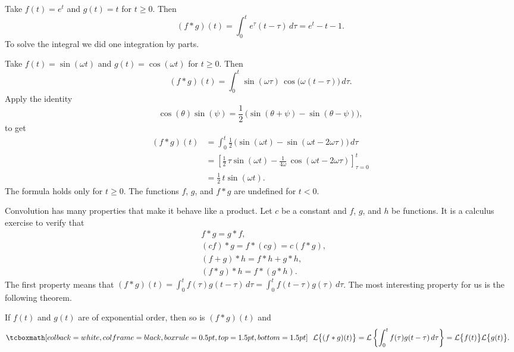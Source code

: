 \begin{example}
Take $f(t) = e^t$ and $g(t) = t$ for $t \geq 0$.  Then 
\begin{equation*}
(f*g)(t)
=
\int_0^t e^\tau (t-\tau) \, d\tau
=
e^t - t - 1 .
\end{equation*}
To solve the integral we
did one integration by parts.
\end{example}

\begin{example} \label{ltc:convsincosex}
Take $f(t) = \sin (\omega t)$ and $g(t) = \cos (\omega t)$ for $t \geq 0$.
Then 
\begin{equation*}
(f*g)(t)
=
\int_0^t  \sin ( \omega \tau ) \,
\cos \bigl( \omega (t-\tau) \bigr) \, d\tau .
\end{equation*}
Apply the identity
\begin{equation*}
\cos (\theta) \sin (\psi) =
\frac{1}{2} \, \bigl( \sin (\theta + \psi) - \sin (\theta - \psi) \bigr) ,
\end{equation*}
to get
\begin{equation*}
\begin{split}
(f*g)(t)
& =
\int_0^t
\frac{1}{2} \, \bigl( \sin (\omega t) - \sin (\omega t - 2 \omega \tau
) \bigr) \, d\tau
\\
& =
\left[ \frac{1}{2} \, \tau  \sin (\omega t) - \frac{1}{4\omega} \, \cos
(\omega t - 2 \omega \tau) \right]_{\tau=0}^t
\\
& = \frac{1}{2} \, t \sin (\omega t) .
\end{split}
\end{equation*}
The formula holds only for $t \geq 0$.  The functions $f$, $g$,
and $f*g$ are undefined for $t < 0$.
\end{example}

Convolution has many properties that make it behave like a product.
Let $c$ be a constant and $f$, $g$, and $h$ be functions.
It is a calculus exercise to verify that
\begin{align*}
& f * g = g * f , \\
& (c f) * g = f * (c g) = c (f*g) , \\
& (f+g) * h = f * h + g * h , \\
& ( f * g ) * h = f * ( g * h ) .
\end{align*}
The first property means that $(f * g)(t) =
\int_0^t f(\tau) g(t-\tau) \, d\tau = 
\int_0^t f(t-\tau) g(\tau) \, d\tau$.
The most interesting property for us is the following theorem.

\begin{theorem}
If $f(t)$ and $g(t)$ are of exponential order, then
so is $(f*g)(t)$ and
\begin{equation*}
\mybxbg{~~
\mathcal{L} \bigl\{ (f*g)(t) \bigr\}
=
\mathcal{L} \left\{ \int_0^t f(\tau) g(t-\tau) \, d\tau \right\}
=
\mathcal{L} \bigl\{ f(t) \bigr\} \mathcal{L} \bigl\{ g(t) \bigr\} .
~~}
\end{equation*}
\end{theorem}

